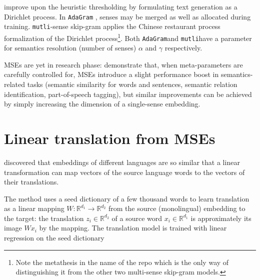 \documentclass[11pt]{article}
\newcommand{\adagram}{\texttt{AdaGram}}
\newcommand{\mutli}{\texttt{mutli}}
\newcommand{\Ro}{\mathbb{R}^{d_1}}
\newcommand{\Rt}{\mathbb{R}^{d_2}}
\begin{document}


\cite{Bartunov:2015,Li:2015} improve upon the heuristic thresholding by
formulating text generation as a Dirichlet process. In \adagram
\citep{Bartunov:2015}, senses may be merged as well as allocated during
training. \mutli-sense skip-gram \citep{Li:2015} applies the Chinese restaurant
process formalization of the Dirichlet process\footnote{Note the metathesis in
the name of the repo which is the only way of distinguishing it from the other
two multi-sense skip-gram models.}. Both \adagram and \mutli have a parameter for
semantics resolution (number of senses) $\alpha$ and $\gamma$ respectively. 


MSEs are yet in
research phase: \cite{Li:2015}  demonstrate that, when meta-parameters are
carefully controlled for, MSEs introduce a slight performance boost in
semantics-related tasks (semantic similarity for words and sentences, semantic
relation identification, part-of-speech tagging), but similar improvements can
be achieved by simply increasing the dimension of a single-sense embedding.

\section{Linear translation from MSEs}

 \cite{Mikolov:2013x} discovered that embeddings of different languages are so
 similar that a linear transformation can map vectors of the source language
 words to the vectors of their translations.

The method uses a seed dictionary of a few thousand words to learn translation
as a linear mapping $W: \mathbb{R}^{d_1}\rightarrow \mathbb{R}^{d_2}$ from the
source (monolingual) embedding to the target: the translation $z_i \in \Rt$ of
a source word $x_i \in \Ro$ is approximately its image $Wx_i$ by the mapping.
The translation model is trained with linear regression on the seed dictionary
\end{document}
